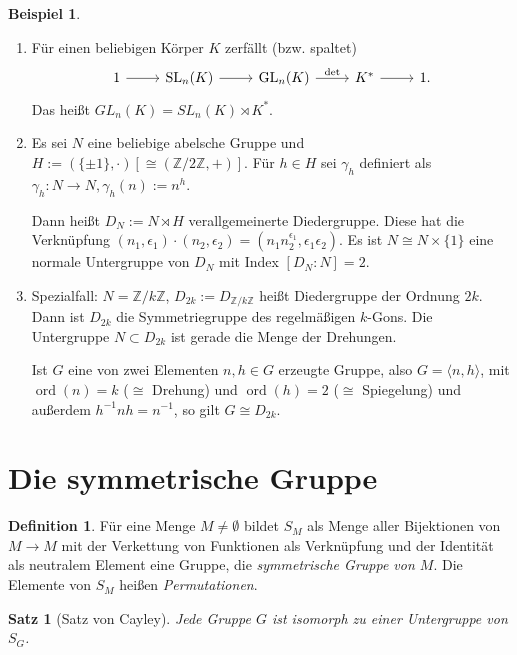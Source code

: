 \documentclass[12pt]{scrartcl} %
\DeclareMathOperator{\GL}{GL}
\DeclareMathOperator{\SL}{SL}
\DeclareMathOperator{\ord}{ord}
\newtheorem{thm}{Satz}
\theoremstyle{definition}
\newtheorem*{defn}{Definition}
\newtheorem{ex}{Beispiel}
\theoremstyle{remark}
\begin{document}
\begin{ex}

\begin{enumerate}[label=(\alph*)]
	\item Für einen beliebigen Körper $K$ zerfällt (bzw. spaltet)
		\[ \begin{tikzcd}
			 1 \arrow[r] & \SL_n(K) \arrow[r] & \GL_n(K) \arrow[r,"\det"] & K^* \arrow[r] & 1.
		\end{tikzcd} \]
		Das heißt $GL_n(K) = SL_n(K)\rtimes K^*$.
	\item Es sei $N$ eine beliebige abelsche Gruppe und $H := (\{\pm 1\},\cdot)\left[\cong(\mathbb{Z}/2\mathbb{Z},+)\right]$. Für $h\in H$ sei $\gamma_h$ definiert als $\gamma_h:N\to N, \gamma_h(n) := n^h$.

		Dann heißt $D_N := N \rtimes H$ verallgemeinerte Diedergruppe. Diese hat die Verknüpfung
		$(n_1,\epsilon_1)\cdot(n_2,\epsilon_2) = (n_1 n_2^{\epsilon_1},\epsilon_1\epsilon_2)$.
		Es ist $N \cong N\times\{1\}$ eine normale Untergruppe von $D_N$ mit Index $[D_N:N] = 2$.

	\item Spezialfall: $N = \mathbb{Z}/k\mathbb{Z}$, $D_{2k} := D_{\mathbb{Z}/k\mathbb{Z}}$ heißt Diedergruppe der Ordnung $2k$.
		Dann ist $D_{2k}$ die Symmetriegruppe des regelmäßigen \(k\)-Gons.
		Die Untergruppe $N\subset D_{2k}$ ist gerade die Menge der Drehungen.

		Ist $G$ eine von zwei Elementen $n,h\in G$ erzeugte Gruppe, also $G = \langle n, h\rangle$, mit $\ord(n) = k$ ($\cong$ Drehung) und $\ord(h) = 2$ ($\cong$ Spiegelung) und außerdem $h^{-1}nh=n^{-1}$, so gilt $G\cong D_{2k}$.
\end{enumerate}

\end{ex}

\section{Die symmetrische Gruppe}

\begin{defn}
	Für eine Menge $M\neq\emptyset$ bildet $S_M$ als Menge aller Bijektionen von $M\to M$ mit der Verkettung von Funktionen als Verknüpfung und der Identität als neutralem Element eine Gruppe, die \emph{symmetrische Gruppe von $M$}.
	Die Elemente von $S_M$ heißen \emph{Permutationen}.
\end{defn}

\begin{thm}[Satz von Cayley]
	Jede Gruppe $G$ ist isomorph zu einer Untergruppe von $S_G$.
\end{thm}
\end{document}

